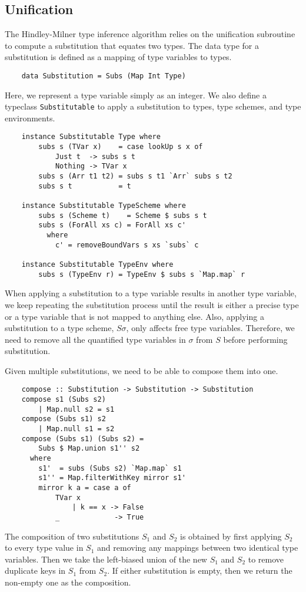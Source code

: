 \subsection{Unification}
The Hindley-Milner type inference algorithm relies on the unification 
subroutine to compute a substitution that equates two types. The 
data type for a substitution is defined as a mapping of type variables 
to types.
\begin{lstlisting}
    data Substitution = Subs (Map Int Type)
\end{lstlisting}
Here, we represent a type variable simply as an integer. We also define 
a typeclass \lstinline{Substitutable} to apply a substitution to types, 
type schemes, and type environments. 
\begin{lstlisting}
    instance Substitutable Type where
        subs s (TVar x)    = case lookUp s x of 
            Just t  -> subs s t 
            Nothing -> TVar x
        subs s (Arr t1 t2) = subs s t1 `Arr` subs s t2
        subs s t           = t

    instance Substitutable TypeScheme where 
        subs s (Scheme t)    = Scheme $ subs s t
        subs s (ForAll xs c) = ForAll xs c'
          where 
            c' = removeBoundVars s xs `subs` c

    instance Substitutable TypeEnv where 
        subs s (TypeEnv r) = TypeEnv $ subs s `Map.map` r
\end{lstlisting}
When applying a substitution to a type variable results in another 
type variable, we keep repeating the substitution process until the result 
is either a precise type or a type variable that is not mapped to anything else. 
Also, applying a substitution to a 
type scheme, $S\sigma$, only affects free type variables. Therefore, 
we need to remove all the quantified type variables in $\sigma$ from $S$ 
before performing substitution.

Given multiple substitutions, we need to be able to compose them into one. 
\begin{lstlisting}
    compose :: Substitution -> Substitution -> Substitution
    compose s1 (Subs s2) 
        | Map.null s2 = s1
    compose (Subs s1) s2 
        | Map.null s1 = s2
    compose (Subs s1) (Subs s2) = 
        Subs $ Map.union s1'' s2  
      where 
        s1'  = subs (Subs s2) `Map.map` s1
        s1'' = Map.filterWithKey mirror s1'
        mirror k a = case a of 
            TVar x 
                | k == x -> False
            _             -> True 
\end{lstlisting}
The composition of two substitutions $S_1$ and $S_2$ is obtained by 
first applying $S_2$ to every type value in $S_1$ and removing any mappings between two 
identical type variables. Then we take the left-biased union of the new $S_1$ 
and $S_2$ to remove duplicate keys in $S_1$ from $S_2$. If either substitution 
is empty, then we return the non-empty one as the composition. 

